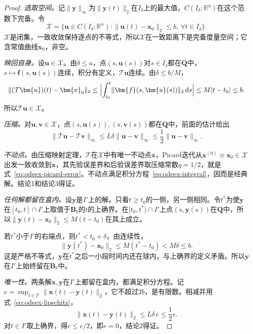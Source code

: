 \begin{proof}
\emph{选取空间。}记$\lVert\bm{y}\rVert_{\infty}$为$\lVert\bm{y}(t)\rVert_2$在$I_\delta$上的最大值，$C(I_\delta;\mathbb{R}^{n})$在这个范数下完备。令
\[
 \mathcal{X}=\bigl\{\bm{u}\in C(I_\delta;\mathbb{R}^{n}):\lVert\bm{u}(t)-\bm{x}_0\rVert_2\leq b,\ \forall t\in I_\delta\bigr\}.
\]
$\mathcal{X}$是闭集，一致收敛保持逐点的不等式，所以$\mathcal{X}$在一致距离下是完备度量空间；它含常值曲线$\bm{x}_0$，非空。

\emph{映回自身。}设$\bm{u}\in\mathcal{X}$。由$\delta\leq a$，点$(s,\bm{u}(s))$对$s\in I_\delta$都在$\bm{Q}$中，$s\mapsto\bm{f}(s,\bm{u}(s))$连续，积分有定义，$\mathcal{T}\bm{u}$连续。由$\delta\leq b/M$，
\[
 \lVert(\mathcal{T}\bm{u})(t)-\bm{x}_0\rVert_2
 \leq\Bigl\lvert\int_{t_0}^{t}\lVert\bm{f}(s,\bm{u}(s))\rVert_2\,\mathrm{d}s\Bigr\rvert
 \leq M\lvert t-t_0\rvert\leq b.
\]
所以$\mathcal{T}\bm{u}\in\mathcal{X}$。

\emph{压缩。}对$\bm{u},\bm{v}\in\mathcal{X}$，点$(s,\bm{u}(s)),(s,\bm{v}(s))$都在$\bm{Q}$中，前面的估计给出
\[
 \lVert\mathcal{T}\bm{u}-\mathcal{T}\bm{v}\rVert_{\infty}\leq L\delta\lVert\bm{u}-\bm{v}\rVert_{\infty}\leq\frac12\lVert\bm{u}-\bm{v}\rVert_{\infty}.
\]

\emph{不动点。}由压缩映射定理，$\mathcal{T}$在$\mathcal{X}$中有唯一不动点$\bm{x}$，Picard迭代从$\bm{x}^{(0)}\equiv\bm{x}_0\in\mathcal{X}$出发一致收敛到$\bm{x}$，其先验误差界和后验误差界取压缩常数$q=1/2$，就是式~\eqref{eq:odeex-picard-error}。不动点满足积分方程~\eqref{eq:odeex-integral}，因而是经典解。结论1和结论3得证。

\emph{任何解都留在盒内。}设$\bm{y}$是$I'$上的解。只看$t\geq t_0$的一侧，另一侧相同。令$t^\ast$为使$\bm{y}$在$[t_0,t]\cap I'$上取值于$\bm{B}_b$的$t$的上确界。在$[t_0,t^\ast)\cap I'$上点$(s,\bm{y}(s))$在$\bm{Q}$中，所以$\lVert\bm{y}(t)-\bm{x}_0\rVert_2\leq M(t-t_0)$在其上成立。

若$t^\ast$小于$I'$的右端点，则$t^\ast<t_0+\delta$，由连续性，
\[
 \lVert\bm{y}(t^\ast)-\bm{x}_0\rVert_2\leq M(t^\ast-t_0)<M\delta\leq b.
\]
这是严格不等式，$\bm{y}$在$t^\ast$之后一小段时间内还在球内，与上确界的定义矛盾。所以$\bm{y}$在$I'$上始终留在$\bm{B}_b$中。

\emph{唯一性。}两条解$\bm{x},\bm{y}$在$I'$上都留在盒内，都满足积分方程。记$e=\sup_{t\in I'}\lVert\bm{x}(t)-\bm{y}(t)\rVert_2$，它不超过$2b$，是有限数。相减并用式~\eqref{eq:odeex-lipschitz}，
\[
 \lVert\bm{x}(t)-\bm{y}(t)\rVert_2\leq L\delta\,e\leq\frac12e.
\]
对$t\in I'$取上确界，得$e\leq e/2$，即$e=0$，结论2得证。
\end{proof}

